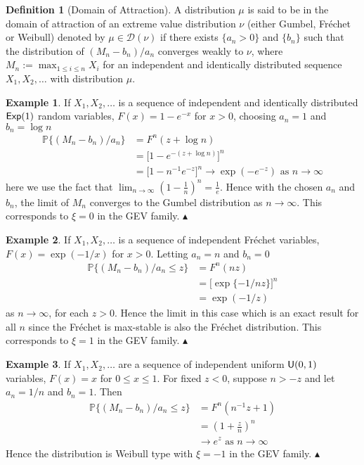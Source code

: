 \documentclass[a4paper,10pt]{article}
\theoremstyle{definition}
\newtheorem{defn}[thm]{Definition}
\newtheorem*{examp}{Example}
\numberwithin{equation}{section}
\newcommand\xqed[1]{%
  \leavevmode\unskip\penalty9999 \hbox{}\nobreak\hfill
  \quad\hbox{#1}}
\newcommand\eqed{\xqed{$\blacktriangle$}}
\begin{document}
\begin{defn}[Domain of Attraction]
A distribution $\mu$ is said to be in the domain of attraction of an extreme value distribution $\nu$ (either Gumbel, Fr\'echet or Weibull) denoted by $\mu \in \mathcal{D}(\nu) $ if there exists $\{a_n>0\}$ and $\{b_n\}$ such that the distribution of $(M_n-b_n)/a_n$ converges weakly to $\nu$, where $M_n:=\max_{1\leq i \leq n}X_i$ for an independent and identically distributed sequence $X_1, X_2, \ldots$ with distribution $\mu$.
\end{defn}

\begin{examp}
If $X_1, X_2, \ldots$ is a sequence of independent and identically distributed $\text{\sffamily Exp}(1)$ random variables, $F(x) = 1-e^{-x}$ for $x>0$, choosing $a_n = 1$ and $b_n = \log n$
\begin{align*}
\mathbb{P}\{(M_n-b_n)/a_n\} &= F^n(z + \log n)\\
&= \bigg[1-e^{-(z+\log n)}\bigg]^n\\
&= \bigg[1-n^{-1}e^{-z}\bigg]^n \to \exp(-e^{-z}) \text{ as } n \to \infty
\end{align*}
here we use the fact that $\lim_{n \to \infty} \left(1-\frac{1}{n}\right)^n = \frac{1}{e}$. Hence with the chosen $a_n$ and $b_n$, the limit of $M_n$ converges to the Gumbel distribution as $n \to \infty$. This corresponds to $\xi = 0$ in the GEV family. \eqed
\end{examp}

\begin{examp}
If $X_1, X_2, \ldots$ is a sequence of independent Fr\'echet variables, $F(x) = \exp(-1/x)$ for $x>0$. Letting $a_n = n$ and $b_n = 0$
\begin{align*}
\mathbb{P}\{(M_n-b_n)/a_n\leq z\}  & = F^n(nz)\\
& = \Big[\exp\{-1/nz\}\Big]^n\\
& = \exp(-1/z)
\end{align*}
as $n \to \infty$, for each $z>0$. Hence the limit in this case which is an exact result for all $n$ since the Fr\'echet is max-stable is also the Fr\'echet distribution. This corresponds to $\xi = 1$ in the GEV family.
\eqed
\end{examp}

\begin{examp}
If $X_1, X_2, \ldots$ are a sequence of independent uniform $\text{\sffamily U}(0,1)$ variables, $F(x)=x$ for $0 \leq x \leq 1$. For fixed $z < 0$, suppose $n>-z$ and let $a_n = 1/n$ and $b_n = 1$. Then
\begin{align*}
\mathbb{P}\{(M_n-b_n)/a_n\leq z\} &= F^n(n^{-1}z+1)\\
&= \left(1+\frac{z}{n}\right)^n\\
&\to e^z \text{ as } n \to \infty
\end{align*}
Hence the distribution is Weibull type with $\xi=-1$ in the GEV family.
\eqed
\end{examp}
\end{document}
